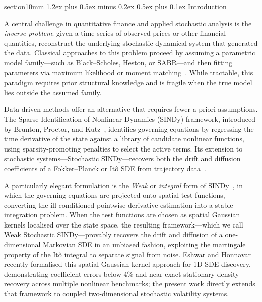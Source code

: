 \documentclass[reprint, amsmath, amssymb, aps, prl, superscriptaddress, nofootinbib]{revtex4-2}
\makeatletter
\def\section{\@startsection
  {section}{1}{0mm}
  {1.2ex plus 0.5ex minus 0.2ex}
  {0.5ex plus 0.1ex}
  {\centering\normalfont\small\bfseries}}
\makeatother
\begin{document}
\maketitle

\section{Introduction}

A central challenge in quantitative finance and applied stochastic analysis is the
\emph{inverse problem}: given a time series of observed prices or other financial
quantities, reconstruct the underlying stochastic dynamical system that generated the
data. Classical approaches to this problem proceed by assuming a parametric model
family---such as Black--Scholes, Heston, or SABR---and then fitting parameters via
maximum likelihood or moment matching~\cite{Heston1993, GatheralJacquier2014}.
While tractable, this paradigm requires prior structural knowledge and is fragile
when the true model lies outside the assumed family.

Data-driven methods offer an alternative that requires fewer a priori assumptions.
The Sparse Identification of Nonlinear Dynamics (SINDy) framework, introduced by
Brunton, Proctor, and Kutz~\cite{Brunton2016}, identifies governing equations by
regressing the time derivative of the state against a library of candidate nonlinear
functions, using sparsity-promoting penalties to select the active terms. Its extension
to stochastic systems---Stochastic SINDy---recovers both the drift and diffusion
coefficients of a Fokker--Planck or It\^{o} SDE from trajectory data~\cite{BoninsegnaEtAl2018,LiEtAl2021}.

A particularly elegant formulation is the \emph{Weak} or \emph{integral} form of
SINDy~\cite{RuddyEtAl2019,WehmeierEtAl2021}, in which the governing equations
are projected onto spatial test functions, converting the ill-conditioned pointwise
derivative estimation into a stable integration problem. When the test functions are
chosen as spatial Gaussian kernels localised over the state space, the resulting
framework---which we call Weak Stochastic SINDy---provably recovers the drift and
diffusion of a one-dimensional Markovian SDE in an unbiased fashion, exploiting
the martingale property of the It\^{o} integral to separate signal from noise.
Eshwar and Honnavar~\cite{EshwarHonnavar2026} recently formalised this spatial
Gaussian kernel approach for 1D SDE discovery, demonstrating coefficient errors
below 4\% and near-exact stationary-density recovery across multiple nonlinear
benchmarks; the present work directly extends that framework to coupled
two-dimensional stochastic volatility systems.
\end{document}
